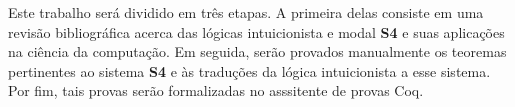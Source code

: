 Este trabalho será dividido em três etapas. A primeira delas consiste em uma revisão bibliográfica acerca das lógicas intuicionista e modal \textbf{S4} e suas aplicações na ciência da computação. Em seguida, serão provados manualmente os teoremas pertinentes ao sistema \textbf{S4} e às traduções da lógica intuicionista a esse sistema. Por fim, tais provas serão formalizadas no asssitente de provas Coq.
